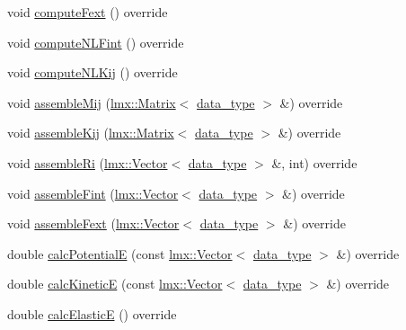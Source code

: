 \begin{DoxyCompactItemize}
\item 
void \hyperlink{classmknix_1_1_gauss_point2_d_a883940868a6a24d6d60a76c008cc3057}{compute\+Fext} () override
\item 
void \hyperlink{classmknix_1_1_gauss_point2_d_ac819bbc7e45e1ed775bbd2e88f083361}{compute\+N\+L\+Fint} () override
\item 
void \hyperlink{classmknix_1_1_gauss_point2_d_a6be7350b45c5a0b6a912bb2559a5d2d2}{compute\+N\+L\+Kij} () override
\item 
void \hyperlink{classmknix_1_1_gauss_point2_d_a92262ee4738a9fb88443d98c185a2890}{assemble\+Mij} (\hyperlink{classlmx_1_1_matrix}{lmx\+::\+Matrix}$<$ \hyperlink{namespacemknix_a16be4b246fbf2cceb141e3a179111020}{data\+\_\+type} $>$ \&) override
\item 
void \hyperlink{classmknix_1_1_gauss_point2_d_a40b82a01657443f98f37225f82ee4985}{assemble\+Kij} (\hyperlink{classlmx_1_1_matrix}{lmx\+::\+Matrix}$<$ \hyperlink{namespacemknix_a16be4b246fbf2cceb141e3a179111020}{data\+\_\+type} $>$ \&) override
\item 
void \hyperlink{classmknix_1_1_gauss_point2_d_a4047e247ff7798aa28116670625c7383}{assemble\+Ri} (\hyperlink{classlmx_1_1_vector}{lmx\+::\+Vector}$<$ \hyperlink{namespacemknix_a16be4b246fbf2cceb141e3a179111020}{data\+\_\+type} $>$ \&, int) override
\item 
void \hyperlink{classmknix_1_1_gauss_point2_d_aefab39c0467742d101c04633be4c759d}{assemble\+Fint} (\hyperlink{classlmx_1_1_vector}{lmx\+::\+Vector}$<$ \hyperlink{namespacemknix_a16be4b246fbf2cceb141e3a179111020}{data\+\_\+type} $>$ \&) override
\item 
void \hyperlink{classmknix_1_1_gauss_point2_d_a9ccb9911d9502e8348c8d61ac534f8cd}{assemble\+Fext} (\hyperlink{classlmx_1_1_vector}{lmx\+::\+Vector}$<$ \hyperlink{namespacemknix_a16be4b246fbf2cceb141e3a179111020}{data\+\_\+type} $>$ \&) override
\item 
double \hyperlink{classmknix_1_1_gauss_point2_d_ab345c399a5a0e1f22b036a75c9049e4d}{calc\+Potential\+E} (const \hyperlink{classlmx_1_1_vector}{lmx\+::\+Vector}$<$ \hyperlink{namespacemknix_a16be4b246fbf2cceb141e3a179111020}{data\+\_\+type} $>$ \&) override
\item 
double \hyperlink{classmknix_1_1_gauss_point2_d_a75d64f3a689bb38054a3c4f9726cccc3}{calc\+Kinetic\+E} (const \hyperlink{classlmx_1_1_vector}{lmx\+::\+Vector}$<$ \hyperlink{namespacemknix_a16be4b246fbf2cceb141e3a179111020}{data\+\_\+type} $>$ \&) override
\item 
double \hyperlink{classmknix_1_1_gauss_point2_d_a54f1859185e8c54320ac1bbfd4518072}{calc\+Elastic\+E} () override
\end{DoxyCompactItemize}
